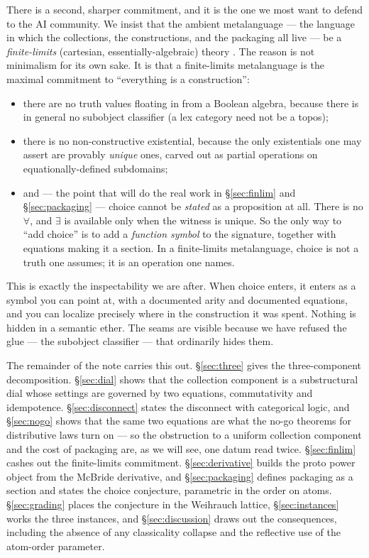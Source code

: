 \documentclass[11pt]{article}
\theoremstyle{definition}
\theoremstyle{plain}
\begin{document}
There is a second, sharper commitment, and it is the one we most want to
defend to the AI community. We insist that the ambient metalanguage --- the
language in which the collections, the constructions, and the packaging all
live --- be a \emph{finite-limits} (cartesian, essentially-algebraic) theory
\cite{Freyd72,GabrielUlmer71,PalmgrenVickers07}. The reason is not
minimalism for its own sake. It is that a finite-limits metalanguage is the
maximal commitment to ``everything is a construction'':
\begin{itemize}[leftmargin=1.4em]
\item there are no truth values floating in from a Boolean algebra, because
      there is in general no subobject classifier (a lex category need not be
      a topos);
\item there is no non-constructive existential, because the only existentials
      one may assert are provably \emph{unique} ones, carved out as partial
      operations on equationally-defined subdomains;
\item and --- the point that will do the real work in
      \S\ref{sec:finlim} and \S\ref{sec:packaging} --- choice cannot be
      \emph{stated} as a proposition at all. There is no $\forall$, and $\exists$
      is available only when the witness is unique. So the only way to
      ``add choice'' is to add a \emph{function symbol} to the signature,
      together with equations making it a section. In a finite-limits
      metalanguage, choice is not a truth one assumes; it is an operation one
      names.
\end{itemize}
This is exactly the inspectability we are after. When choice enters, it enters
as a symbol you can point at, with a documented arity and documented
equations, and you can localize precisely where in the construction it was
spent. Nothing is hidden in a semantic ether. The seams are visible because
we have refused the glue --- the subobject classifier --- that ordinarily
hides them.

The remainder of the note carries this out. \S\ref{sec:three} gives the
three-component decomposition. \S\ref{sec:dial} shows that the collection
component is a substructural dial whose settings are governed by two
equations, commutativity and idempotence. \S\ref{sec:disconnect} states the
disconnect with categorical logic, and \S\ref{sec:nogo} shows that the same
two equations are what the no-go theorems for distributive laws turn on ---
so the obstruction to a uniform collection component and the cost of packaging
are, as we will see, one datum read twice. \S\ref{sec:finlim} cashes out the
finite-limits commitment. \S\ref{sec:derivative} builds the proto power
object from the McBride derivative, and \S\ref{sec:packaging} defines
packaging as a section and states the choice conjecture, parametric in the
order on atoms. \S\ref{sec:grading} places the conjecture in the Weihrauch
lattice, \S\ref{sec:instances} works the three instances, and
\S\ref{sec:discussion} draws out the consequences, including the absence of
any classicality collapse and the reflective use of the atom-order parameter.
\end{document}

